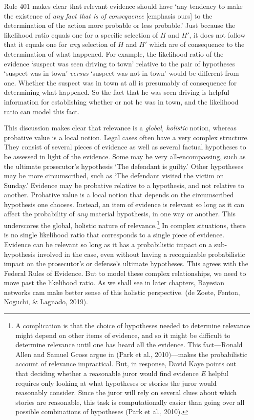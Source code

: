 \documentclass[
  10pt,
  dvipsnames,enabledeprecatedfontcommands]{scrartcl}
\begin{document}
Rule 401 makes clear that relevant evidence should have `any tendency to
make the existence of \emph{any fact that is of consequence} {[}emphasis
ours{]} to the determination of the action more probable or less
probable.' Just because the likelihood ratio equals one for a specific
selection of \(H\) and \(H'\), it does not follow that it equals one for
\textit{any} selection of \(H\) and \(H'\) which are of consequence to
the determination of what happened. For example, the likelihood ratio of
the evidence `suspect was seen driving to town' relative to the pair of
hypotheses `suspect was in town' \textit{versus} `suspect was not in
town' would be different from one. Whether the suspect was in town at
all is presumably of consequence for determining what happened. So the
fact that he was seen driving is helpful information for establishing
whether or not he was in town, and the likelihood ratio can model this
fact.

This discussion makes clear that relevance is a
\textit{global, holistic} notion, whereas probative value is a local
notion. Legal cases often have a very complex structure. They consist of
several pieces of evidence as well as several factual hypotheses to be
assessed in light of the evidence. Some may be very all-encompassing,
such as the ultimate prosecutor's hypothesis `The defendant is guilty.'
Other hypotheses may be more circumscribed, such as `The defendant
visited the victim on Sunday.' Evidence may be probative relative to a
hypothesis, and not relative to another. Probative value is a local
notion that depends on the circumscribed hypothesis one chooses.
Instead, an item of evidence is relevant so long as it can affect the
probability of \textit{any} material hypothesis, in one way or another.
This underscores the global, holistic nature of relevance.\footnote{A
  complication is that the choice of hypotheses needed to determine
  relevance might depend on other items of evidence, and so it might be
  difficult to determine relevance until one has heard all the evidence.
  This fact---Ronald Allen and Samuel Gross argue in (Park et al.,
  2010)---makes the probabilistic account of relevance impractical. But,
  in response, David Kaye points out that deciding whether a reasonable
  juror would find evidence \(E\) helpful requires only looking at what
  hypotheses or stories the juror would reasonably consider. Since the
  juror will rely on several clues about which stories are reasonable,
  this task is computationally easier than going over all possible
  combinations of hypotheses (Park et al., 2010).} In complex
situations, there is no single likelihood ratio that corresponds to a
single piece of evidence. Evidence can be relevant so long as it has a
probabilistic impact on a sub-hypothesis involved in the case, even
without having a recognizable probabilistic impact on the prosecutor's
or defense's ultimate hypotheses. This agrees with the Federal Rules of
Evidence. But to model these complex relationships, we need to move past
the likelihood ratio. As we shall see in later chapters, Bayesian
networks cam make better sense of this holistic perspective. (de Zoete,
Fenton, Noguchi, \& Lagnado, 2019).
\end{document}
